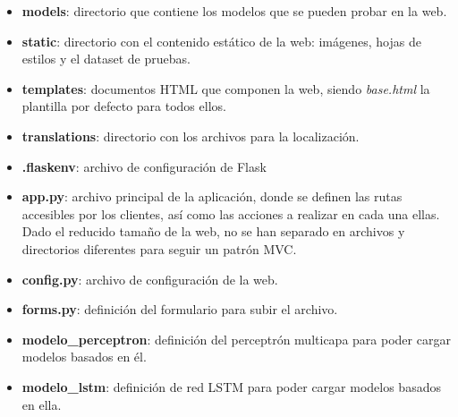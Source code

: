 \begin{itemize}
    \item \textbf{models}: directorio que contiene los modelos que se pueden probar en la web.
    \item \textbf{static}: directorio con el contenido estático de la web: imágenes, hojas de estilos y el dataset de pruebas.
    \item \textbf{templates}: documentos HTML que componen la web, siendo \textit{base.html} la plantilla por defecto para todos ellos.
    \item \textbf{translations}: directorio con los archivos para la localización.
	\item \textbf{.flaskenv}: archivo de configuración de Flask
	\item \textbf{app.py}: archivo principal de la aplicación, donde se definen las rutas accesibles por los clientes, así como las acciones a realizar en cada una ellas. Dado el reducido tamaño de la web, no se han separado en archivos y directorios diferentes para seguir un patrón MVC.
	\item \textbf{config.py}: archivo de configuración de la web.
	\item \textbf{forms.py}: definición del formulario para subir el archivo.
	\item \textbf{modelo\_perceptron}: definición del perceptrón multicapa para poder cargar modelos basados en él.
    \item \textbf{modelo\_lstm}: definición de red LSTM para poder cargar modelos basados en ella.
\end{itemize}
